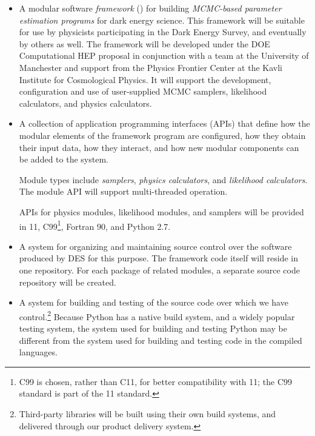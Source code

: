 \documentclass[draftmode,draftwater]{memarticle}
\newcommand{\facs}{\name{FACS}\xspace}
\newcommand{\cosmosis}{\name{CosmoSIS}\xspace}
\begin{document}
\begin{itemize}

\item A modular software \emph{framework} (\cosmosis) for building
  \emph{MCMC-based parameter estimation programs} for dark energy
  science. This framework will be suitable for use by physicists
  participating in the Dark Energy Survey, and eventually by others as
  well. The framework will be developed under the DOE Computational HEP
  \facs proposal in conjunction with a team at the University of Manchester and support from the Physics Frontier Center at the Kavli Institute for Cosmological Physics. It will support the development, configuration and use
  of user-supplied MCMC samplers, likelihood calculators, and physics
  calculators.

\item A collection of application programming interfaces (APIs) that
  define how the modular elements of the framework program are
  configured, how they obtain their input data, how they interact, and
  how new modular components can be added to the system.

  Module types include \emph{samplers}, \emph{physics calculators}, and
  \emph{likelihood calculators}. The module API will support
  multi-threaded operation.


  APIs for physics modules, likelihood modules, and samplers will be
  provided in \cpp{}11, C99\footnote{C99 is chosen, rather than C11, for
    better compatibility with \cpp{}11; the C99 standard is part of the
    \cpp{}11 standard.}, Fortran 90, and Python 2.7.

\item A system for organizing and maintaining source control over the
  software produced by DES for this purpose. The \cosmosis framework
  code itself will reside in one repository. For each package of related
  modules, a separate source code repository will be created.

\item A system for building and testing of the source code over which we
  have control.\footnote{Third-party libraries will be built using their
    own build systems, and delivered through our product delivery
    system.} Because Python has a native build system, and a widely
  popular testing system, the system used for building and testing
  Python may be different from the system used for building and testing
  code in the compiled languages.


\end{itemize}
\end{document}

